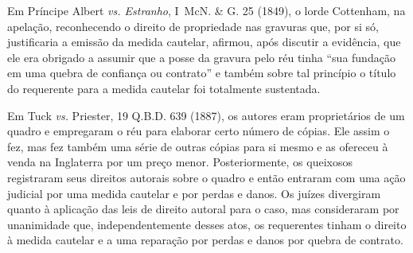 Em Príncipe Albert \emph{vs. Estranho}, I~McN. \& G. 25 (1849), o lorde
Cottenham, na apelação, reconhecendo o direito de propriedade nas
gravuras que, por si só, justificaria a emissão da medida cautelar,
afirmou, após discutir a evidência, que ele era obrigado a assumir que a
posse da gravura pelo réu tinha ``sua fundação em uma quebra de
confiança ou contrato'' e também sobre tal princípio o título do
requerente para a medida cautelar foi totalmente sustentada.

Em Tuck \emph{vs.} Priester, 19 Q.B.D. 639 (1887), os autores eram
proprietários de um quadro e empregaram o réu para elaborar certo número
de cópias. Ele assim o fez, mas fez também uma série de outras cópias
para si mesmo e as ofereceu à venda na Inglaterra por um preço menor.
Posteriormente, os queixosos registraram seus direitos autorais sobre o
quadro e então entraram com uma ação judicial por uma medida cautelar e
por perdas e danos. Os juízes divergiram quanto à aplicação das leis de
direito autoral para o caso, mas consideraram por unanimidade que,
independentemente desses atos, os requerentes tinham o direito à medida
cautelar e a uma reparação por perdas e danos por quebra de contrato.

